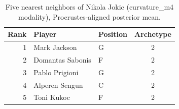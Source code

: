 \begin{table}[htbp]
  \centering\small
  \begin{tabular}{rllc}
    \toprule
    Rank & Player & Position & Archetype \\
    \midrule
    1 & Mark Jackson & G & 2 \\
    2 & Domantas Sabonis & F & 2 \\
    3 & Pablo Prigioni & G & 2 \\
    4 & Alperen Sengun & C & 2 \\
    5 & Toni Kukoc & F & 2 \\
    \bottomrule
  \end{tabular}
  \caption{Five nearest neighbors of Nikola Jokic (curvature_m4 modality), Procrustes-aligned posterior mean.}
  \label{tab:Nikola_Jokic_neighbors_curvature_m4}
\end{table}

